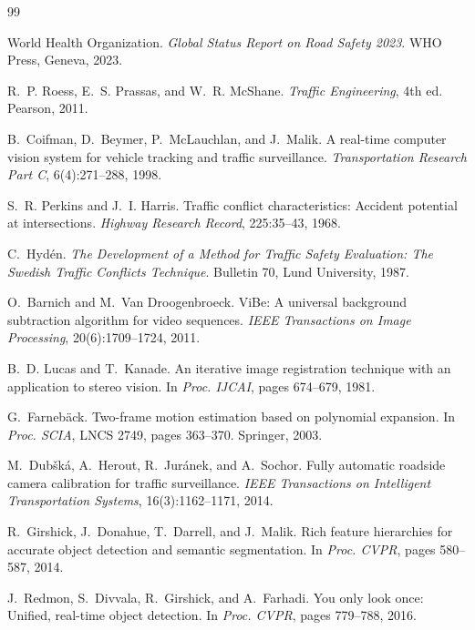 \documentclass[12pt]{report}
\begin{document}


\begin{thebibliography}{99}

World Health Organization.
\textit{Global Status Report on Road Safety 2023}.
WHO Press, Geneva, 2023.

R.~P. Roess, E.~S. Prassas, and W.~R. McShane.
\textit{Traffic Engineering}, 4th ed.
Pearson, 2011.

B.~Coifman, D.~Beymer, P.~McLauchlan, and J.~Malik.
A real-time computer vision system for vehicle tracking and traffic surveillance.
\textit{Transportation Research Part C}, 6(4):271--288, 1998.

S.~R. Perkins and J.~I. Harris.
Traffic conflict characteristics: Accident potential at intersections.
\textit{Highway Research Record}, 225:35--43, 1968.

C.~Hyd\'{e}n.
\textit{The Development of a Method for Traffic Safety Evaluation: The Swedish Traffic Conflicts Technique}.
Bulletin 70, Lund University, 1987.

O.~Barnich and M.~Van Droogenbroeck.
ViBe: A universal background subtraction algorithm for video sequences.
\textit{IEEE Transactions on Image Processing}, 20(6):1709--1724, 2011.

B.~D. Lucas and T.~Kanade.
An iterative image registration technique with an application to stereo vision.
In \textit{Proc. IJCAI}, pages 674--679, 1981.

G.~Farneb\"{a}ck.
Two-frame motion estimation based on polynomial expansion.
In \textit{Proc. SCIA}, LNCS 2749, pages 363--370. Springer, 2003.

M.~Dub\v{s}k\'{a}, A.~Herout, R.~Jur\'{a}nek, and A.~Sochor.
Fully automatic roadside camera calibration for traffic surveillance.
\textit{IEEE Transactions on Intelligent Transportation Systems}, 16(3):1162--1171, 2014.

R.~Girshick, J.~Donahue, T.~Darrell, and J.~Malik.
Rich feature hierarchies for accurate object detection and semantic segmentation.
In \textit{Proc. CVPR}, pages 580--587, 2014.

J.~Redmon, S.~Divvala, R.~Girshick, and A.~Farhadi.
You only look once: Unified, real-time object detection.
In \textit{Proc. CVPR}, pages 779--788, 2016.


\end{thebibliography}
\end{document}
